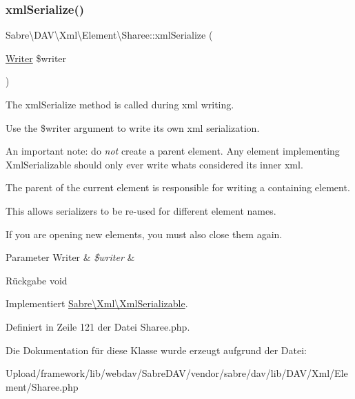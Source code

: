 \subsubsection{\texorpdfstring{xml\+Serialize()}{xmlSerialize()}}
{\footnotesize\ttfamily Sabre\textbackslash{}\+D\+A\+V\textbackslash{}\+Xml\textbackslash{}\+Element\textbackslash{}\+Sharee\+::xml\+Serialize (\begin{DoxyParamCaption}\item[{\mbox{\hyperlink{class_sabre_1_1_xml_1_1_writer}{Writer}}}]{\$writer }\end{DoxyParamCaption})}

The xml\+Serialize method is called during xml writing.

Use the \$writer argument to write its own xml serialization.

An important note\+: do {\itshape not} create a parent element. Any element implementing Xml\+Serializable should only ever write what\textquotesingle{}s considered its \textquotesingle{}inner xml\textquotesingle{}.

The parent of the current element is responsible for writing a containing element.

This allows serializers to be re-\/used for different element names.

If you are opening new elements, you must also close them again.


\begin{DoxyParams}[1]{Parameter}
Writer & {\em \$writer} & \\
\hline
\end{DoxyParams}
\begin{DoxyReturn}{Rückgabe}
void 
\end{DoxyReturn}


Implementiert \mbox{\hyperlink{interface_sabre_1_1_xml_1_1_xml_serializable_aa78f3ee43aa699be8347181653a53d8c}{Sabre\textbackslash{}\+Xml\textbackslash{}\+Xml\+Serializable}}.



Definiert in Zeile 121 der Datei Sharee.\+php.



Die Dokumentation für diese Klasse wurde erzeugt aufgrund der Datei\+:\begin{DoxyCompactItemize}
\item 
Upload/framework/lib/webdav/\+Sabre\+D\+A\+V/vendor/sabre/dav/lib/\+D\+A\+V/\+Xml/\+Element/Sharee.\+php\end{DoxyCompactItemize}
